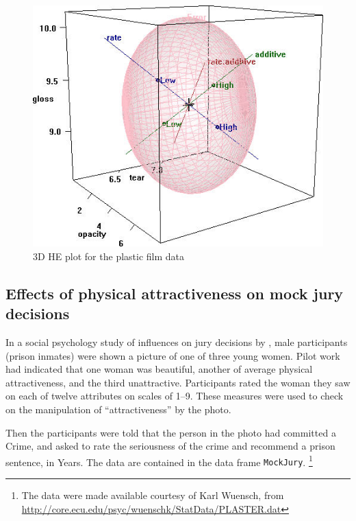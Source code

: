 \documentclass[11pt]{article}
\newcommand{\code}[1]{{\texttt{#1}}}
\begin{document}
\begin{figure}[htb]
\begin{center}
\includegraphics[clip]{plastic1-HE3D}
\caption{3D HE plot for the plastic film data}
\label{fig:plastic1-HE3D}
\end{center}
\end{figure}


\subsection[Mock jury decisions]{Effects of physical attractiveness on mock jury decisions}

In a social psychology
study of influences on jury decisions
by \citet{Plaster:89},
male participants (prison inmates)
were shown a picture of one of three young women.  
Pilot  work
had indicated  that one woman  was beautiful,  another of  average physical
attractiveness, and the third  unattractive.  Participants rated the  woman they
saw on each  of twelve attributes on scales of 1--9.  These measures were used to check on the
manipulation of ``attractiveness'' by the photo.

Then the participants were told that the person in the photo had committed a
Crime, and asked to rate the seriousness of the crime and recommend a
prison sentence, in Years.  The data are contained in the data frame \code{MockJury}.%
\footnote{The data were made available courtesy of Karl Wuensch, from
	\url{http://core.ecu.edu/psyc/wuenschk/StatData/PLASTER.dat}
}
\end{document}
